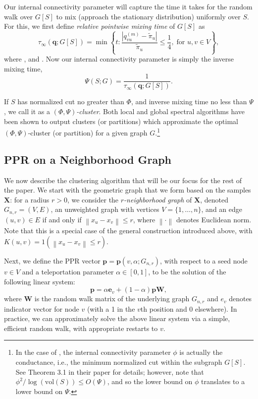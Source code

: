 \documentclass{article}
\newcommand{\set}[1]{\left\{#1\right\}}
\newcommand{\vol}{\mathrm{vol}}
\newcommand{\norm}[1]{\left\lVert#1\right\rVert}
\newcommand{\1}{\mathbf{1}}
\newcommand{\pbf}{\mathbf{p}}
\newcommand{\qbf}{\mathbf{q}}
\newcommand{\ebf}[1]{\mathbf{e}_{#1}}
\newcommand{\Xbf}{\mathbf{X}}
\newcommand{\Wbf}{\mathbf{W}}
\theoremstyle{aldenthm}
\theoremstyle{aldenrmrk}
\begin{document}
Our internal connectivity parameter will capture the time it takes for the
random walk over $G[S]$ to mix (approach the stationary distribution)
uniformly over $S$.  For this, we first define \emph{relative pointwise mixing
  time} of $G[S]$ as 
\begin{equation*}
\tau_{\infty}(\qbf; G[S]) = \min\set{ t: \frac{|q_{vu}^{(m)} -
      \tilde\pi_u|}{\tilde\pi_u} \leq \frac{1}{4}, \; \text{for $u,v \in V$}}, 
\end{equation*}
where \smash{$\qbf = (\qbf_v^{(1)}, \qbf_v^{(2)}, ...)_{v \in V}$}, and
\smash{$\qbf_v^{(m)} = (q_{vu}^{(m)})_{u \in V}$}. Now our internal 
connectivity parameter is simply the inverse mixing time,
\begin{equation}
\label{eqn: inv_mixing_time}
\Psi(S; G) = \frac{1}{\tau_{\infty}(\qbf; G[S])}.
\end{equation}

If $S$ has normalized cut no greater than $\Phi$, and inverse mixing time no
less than $\Psi$, we call it as a \emph{$(\Phi,\Psi)$-cluster}. Both
local \cite{zhu2013} and global \cite{kannan04} spectral algorithms have been
shown to output clusters (or partitions) which approximate the optimal $(\Phi,
\Psi)$-cluster (or partition) for a given graph $G$.\footnote{In the case of
  \cite{kannan04}, the internal connectivity parameter $\phi$ is actually the
  conductance, i.e., the minimum normalized cut within the subgraph $G[S]$. See
  Theorem 3.1 in their paper for details; however, note that $\phi^2 /
  \log(\vol(S)) \leq O(\Psi)$, and so the lower bound on $\phi$ translates to a
  lower bound on $\Psi$.}   

\subsection{PPR on a Neighborhood Graph}

We now describe the clustering algorithm that will be our focus for the rest of 
the paper. We start with the geometric graph that we form based on the samples 
$\Xbf$: for a radius $r > 0$, we consider the \emph{$r$-neighborhood graph} of 
$\Xbf$, denoted $G_{n,r}=(V,E)$, an unweighted graph with vertices
$V=\{1,\ldots,n\}$, and an edge $(u,v) \in E$ if and only if $\norm{x_u - x_v}
\leq  r$, where $\norm{\cdot}$ denotes Euclidean norm.  Note that this is a
special case of the general construction introduced above, with 
$K(u,v) = 1(\norm{x_u - x_v} \leq r)$. 

Next, we define the PPR vector $\pbf = \pbf(v,\alpha;G_{n,r})$, with respect to  
a seed node $v \in V$ and a teleportation parameter $\alpha \in [0,1]$, to be
the solution of the following linear system:
\begin{equation}
\label{eqn: ppr_vector}
\pbf = \alpha \ebf{v} + (1 - \alpha) \pbf \Wbf,
\end{equation}
where $\Wbf$ is the random walk matrix of the underlying graph $G_{n,r}$ 
and $e_{v}$ denotes indicator vector for node $v$ (with a 1 in the $v$th
position and 0 elsewhere).  In practice, we can approximately solve the above
linear system via a simple, efficient random walk, with appropriate restarts to
$v$. 
\end{document}
